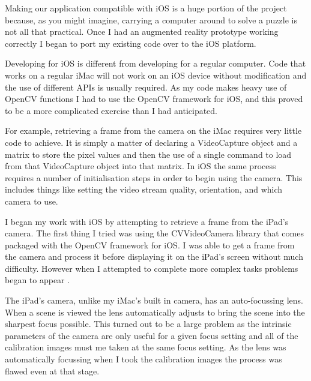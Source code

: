 \documentclass{article}
\begin{document}
Making our application compatible with iOS is a huge portion of the project because, as you might imagine, carrying a computer around to solve a puzzle is not all that practical. Once I had an augmented reality prototype working correctly I began to port my existing code over to the iOS platform. \par

Developing for iOS is different from developing for a regular computer. Code that works on a regular iMac will not work on an iOS device without modification and the use of different APIs is usually required. As my code makes heavy use of OpenCV functions I had to use the OpenCV framework for iOS, and this proved to be a more complicated exercise than I had anticipated. \par

For example, retrieving a frame from the camera on the iMac requires very little code to achieve. It is simply a matter of declaring a VideoCapture object and a matrix to store the pixel values and then the use of a single command to load from that VideoCapture object into that matrix. In iOS the same process requires a number of initialisation steps in order to begin using the camera. This includes things like setting the video stream quality, orientation, and which camera to use. \par

I began my work with iOS by attempting to retrieve a frame from the iPad's camera. The first thing I tried was using the CVVideoCamera library that comes packaged with the OpenCV framework for iOS. I was able to get a frame from the camera and process it before displaying it on the iPad's screen without much difficulty. However when I attempted to complete more complex tasks problems began to appear \cite{iOS}. \par

The iPad's camera, unlike my iMac's built in camera, has an auto-focussing lens. When a scene is viewed the lens automatically adjusts to bring the scene into the sharpest focus possible. This turned out to be a large problem as the intrinsic parameters of the camera are only useful for a given focus setting and all of the calibration images must me taken at the same focus setting. As the lens was automatically focussing when I took the calibration images the process was flawed even at that stage. \par
\end{document}
